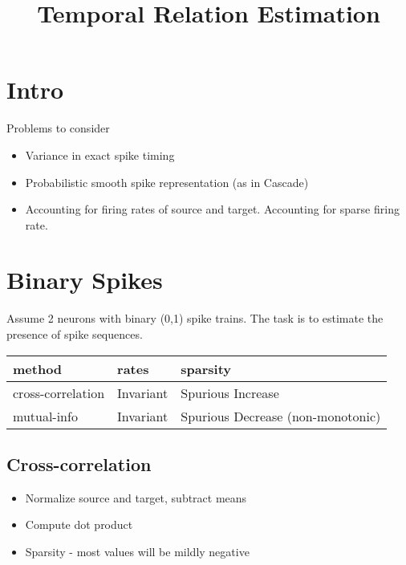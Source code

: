 \documentclass[a4paper,10pt]{article}
\title{Temporal Relation Estimation}
\author{}
\begin{document}
\maketitle

\section{Intro}

Problems to consider
\begin{itemize}
 \item Variance in exact spike timing
 \item Probabilistic smooth spike representation (as in Cascade)
 \item Accounting for firing rates of source and target. Accounting for sparse firing rate.
\end{itemize}

\section{Binary Spikes}

Assume 2 neurons with binary (0,1) spike trains. The task is to estimate the presence of spike sequences. \\

\begin{tabular}{|l | l | l|}
	\hline
   method & rates & sparsity \\ \hline
   cross-correlation & Invariant & Spurious Increase \\
   mutual-info & Invariant & Spurious Decrease (non-monotonic) \\
\end{tabular}


\subsection{Cross-correlation}

\begin{itemize}
\item Normalize source and target, subtract means
\item Compute dot product
\item Sparsity - most values will be mildly negative

\end{itemize}
\end{document}
